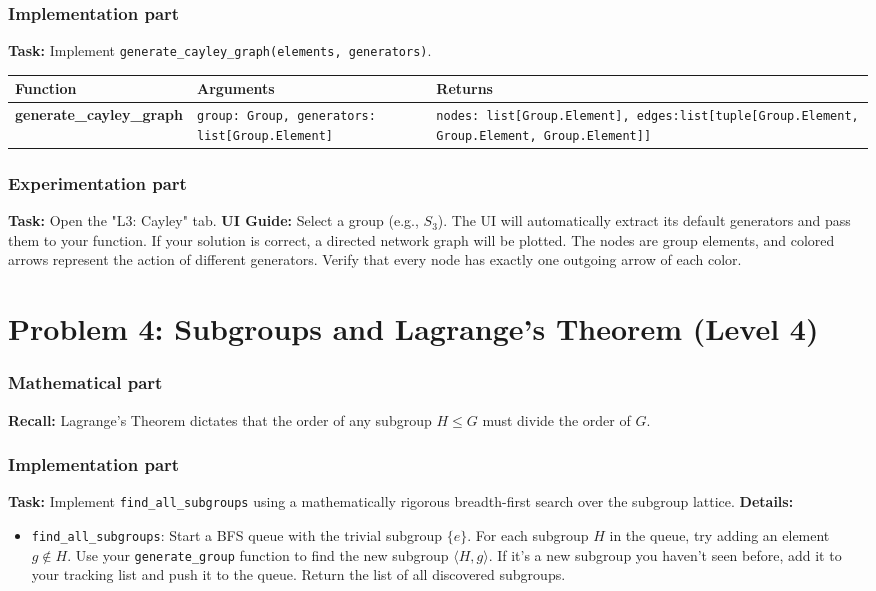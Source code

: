 \documentclass[11pt]{article}
\begin{document}
\subsubsection*{Implementation part}
\textbf{Task:} Implement \lstinline|generate_cayley_graph(elements, generators)|.
\begin{center}
\renewcommand{\arraystretch}{1.5}
\begin{tabularx}{\textwidth}{@{} >{\bfseries}l >{\hsize=0.7\hsize}X >{\hsize=1.3\hsize}X @{}}
\toprule
Function & Arguments & Returns \\ \midrule
generate\_cayley\_graph & \lstinline|group: Group, generators: list[Group.Element]| & \lstinline|nodes: list[Group.Element], edges:list[tuple[Group.Element, Group.Element, Group.Element]]| \\
\bottomrule
\end{tabularx}
\end{center}

\subsubsection*{Experimentation part}
\textbf{Task:} Open the "L3: Cayley" tab. 
\textbf{UI Guide:} Select a group (e.g., $S_3$). The UI will automatically extract its default generators and pass them to your function. If your solution is correct, a directed network graph will be plotted. The nodes are group elements, and colored arrows represent the action of different generators. Verify that every node has exactly one outgoing arrow of each color.

\vspace{1cm}

\section*{Problem 4: Subgroups and Lagrange's Theorem (Level 4)}

\subsubsection*{Mathematical part}
\textbf{Recall:} Lagrange's Theorem dictates that the order of any subgroup $H \le G$ must divide the order of $G$.

\subsubsection*{Implementation part}
\textbf{Task:} Implement \lstinline|find_all_subgroups| using a mathematically rigorous breadth-first search over the subgroup lattice.
\textbf{Details:} 
\begin{itemize}
    \item \lstinline|find_all_subgroups|: Start a BFS queue with the trivial subgroup $\{e\}$. For each subgroup $H$ in the queue, try adding an element $g \notin H$. Use your \lstinline|generate_group| function to find the new subgroup $\langle H, g \rangle$. If it's a new subgroup you haven't seen before, add it to your tracking list and push it to the queue. Return the list of all discovered subgroups.
\end{itemize}
\end{document}

